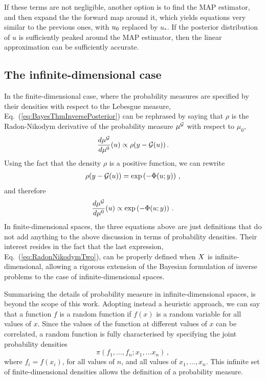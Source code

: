 If these terms are not negligible, another option is to find the MAP estimator,
and then expand the the forward map around it, which yields equations very
similar to the previous ones, with $u_0$ replaced by $u_*$. If the
posterior distribution of $u$ is sufficiently peaked around the
MAP estimator, then the linear approximation can be sufficiently accurate. 


\subsection{The infinite-dimensional case}
\label{sec:infin-dimens-case}

In the finite-dimensional case, where the probability measures are specified by
their densities with respect to the Lebesgue measure,
Eq.~(\ref{eq:BayesThmInversePosterior}) can be rephrased by saying  that $\rho$
is the Radon-Nikodym derivative of the probability measure $\mu^{\mathcal{G}}$ with
respect to $\mu_0$, \viz
\begin{align}
  \label{eq:RadonNikodym}
  \frac{d\mu^{\mathcal{G}}}{d\mu^0} (u) \propto \rho(y-\mathcal{G}(u))\, .
\end{align}
Using the fact that the density $\rho$ is a positive function, we can rewrite 
\begin{align}
  \label{eq:PotentialDef}
  \rho(y-\mathcal{G}(u)) = \exp\left(-\Phi(u;y)\right)\, ,
\end{align}
and therefore
\begin{align}
  \label{eq:RadonNikodymTwo}
  \frac{d\mu^{\mathcal{G}}}{d\mu^0} (u) \propto \exp\left(-\Phi(u;y)\right)\, .
\end{align}
In finite-dimensional spaces, the three equations above are just definitions
that do not add anything to the above discussion in terms of probability
densities. Their interest resides in the fact that the last expression,
Eq.~(\ref{eq:RadonNikodymTwo}), can be properly defined when $X$ is
infinite-dimensional, allowing a rigorous extension of the Bayesian formulation
of inverse problems to the case of infinite-dimensional spaces. 

Summarising the details of probability measure in infinite-dimensional spaces,
is beyond the scope of this work. Adopting instead a heuristic approach, we can
say that a function $f$ is a random function if $f(x)$ is a random variable for
all values of $x$. Since the values of the function at different values of $x$
can be correlated, a random function is fully characterised by specifying the
joint probability densities
\begin{equation}
  \label{eq:RandomFuncJointProb}
  \pi\left(
    f_1, \ldots, f_n; x_1, \ldots x_n
  \right)\, ,
\end{equation}
where $f_i=f(x_i)$, for all values of $n$, and all values of $x_1, \ldots, x_n$.
This infinite set of finite-dimensional densities allows the definition of a
probability measure. 

